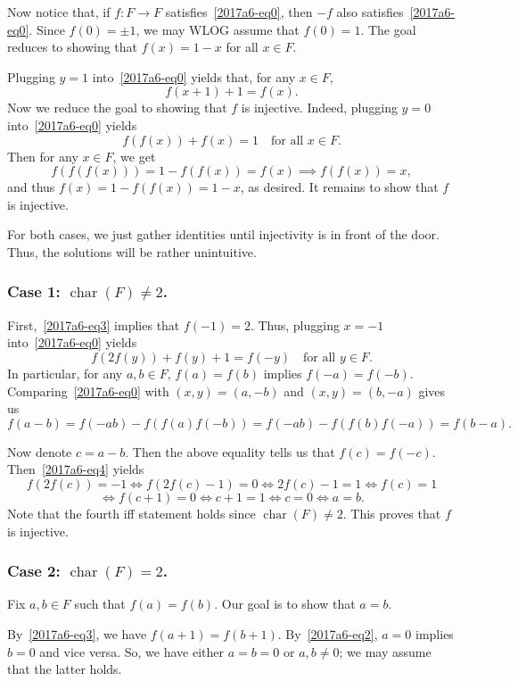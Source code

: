 \documentclass{article}
\DeclareMathOperator{\rchar}{char}
\begin{document}
Now notice that, if $f : F \to F$ satisfies~\eqref{2017a6-eq0}, then $-f$ also satisfies~\eqref{2017a6-eq0}.
Since $f(0) = \pm 1$, we may WLOG assume that $f(0) = 1$.
The goal reduces to showing that $f(x) = 1 - x$ for all $x \in F$.

Plugging $y = 1$ into~\eqref{2017a6-eq0} yields that, for any $x \in F$,
\[ f(x + 1) + 1 = f(x). \tag{3}\label{2017a6-eq3} \]
Now we reduce the goal to showing that $f$ is injective.
Indeed, plugging $y = 0$ into~\eqref{2017a6-eq0} yields
\[ f(f(x)) + f(x) = 1 \quad \text{for all } x \in F. \]
Then for any $x \in F$, we get
\[ f(f(f(x))) = 1 - f(f(x)) = f(x) \implies f(f(x)) = x, \]
    and thus $f(x) = 1 - f(f(x)) = 1 - x$, as desired.
It remains to show that $f$ is injective.

For both cases, we just gather identities until injectivity is in front of the door.
Thus, the solutions will be rather unintuitive.



\subsubsection*{Case 1: $\rchar(F) \neq 2$.}

First,~\eqref{2017a6-eq3} implies that $f(-1) = 2$.
Thus, plugging $x = -1$ into~\eqref{2017a6-eq0} yields
\[ f(2f(y)) + f(y) + 1 = f(-y) \quad \text{for all } y \in F. \tag{4}\label{2017a6-eq4} \]
In particular, for any $a, b \in F$, $f(a) = f(b)$ implies $f(-a) = f(-b)$.
Comparing~\eqref{2017a6-eq0} with $(x, y) = (a, -b)$ and $(x, y) = (b, -a)$ gives us
\[ f(a - b) = f(-ab) - f(f(a) f(-b)) = f(-ab) - f(f(b) f(-a)) = f(b - a). \]

Now denote $c = a - b$.
Then the above equality tells us that $f(c) = f(-c)$.
Then~\eqref{2017a6-eq4} yields
\[ f(2f(c)) = -1 \iff f(2f(c) - 1) = 0 \iff 2f(c) - 1 = 1 \iff f(c) = 1 \]
\[ \iff f(c + 1) = 0 \iff c + 1 = 1 \iff c = 0 \iff a = b. \]
Note that the fourth iff statement holds since $\rchar(F) \neq 2$.
This proves that $f$ is injective.



\subsubsection*{Case 2: $\rchar(F) = 2$.}

Fix $a, b \in F$ such that $f(a) = f(b)$.
Our goal is to show that $a = b$.

By~\eqref{2017a6-eq3}, we have $f(a + 1) = f(b + 1)$.
By~\eqref{2017a6-eq2}, $a = 0$ implies $b = 0$ and vice versa.
So, we have either $a = b = 0$ or $a, b \neq 0$; we may assume that the latter holds.
\end{document}
